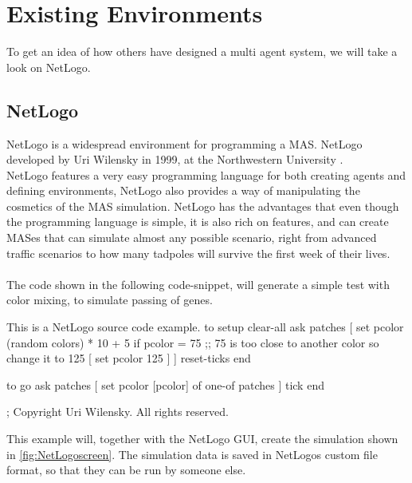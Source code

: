 \chapter{Existing Environments}
\label{sec:environments}

To get an idea of how others have designed a multi agent system, we will take a look on NetLogo.\\

\section{NetLogo}
NetLogo is a widespread environment for programming a MAS. NetLogo developed by Uri Wilensky in 1999, at the Northwestern University \cite{misc:northwestern}.\\ 
\indent NetLogo features a very easy programming language for both creating agents and defining environments, NetLogo also provides a way of manipulating the cosmetics of the MAS simulation. NetLogo has the advantages that even though the programming language is simple, it is also rich on features, and can create MASes that can simulate almost any possible scenario, right from advanced traffic scenarios to how many tadpoles will survive the first week of their lives. \cite{misc:netlogolib} \\
\\
The code shown in the following code-snippet, will generate a simple test with color mixing, to simulate passing of genes.

\begin{NetLogo}{This is a NetLogo source code example.}{}
to setup
  clear-all
  ask patches
    [ set pcolor (random colors) * 10 + 5
        if pcolor = 75  ;; 75 is too close to another color so change it to 125
          [ set pcolor 125 ] ]
  reset-ticks
end

to go
  ask patches [ set pcolor [pcolor] of one-of patches ]
  tick
end


; Copyright Uri Wilensky. All rights reserved.
\end{NetLogo}

This example will, together with the NetLogo GUI, create the simulation shown in \ref{fig:NetLogoscreen}. The simulation data is saved in NetLogos custom file format, so that they can be run by someone else.

